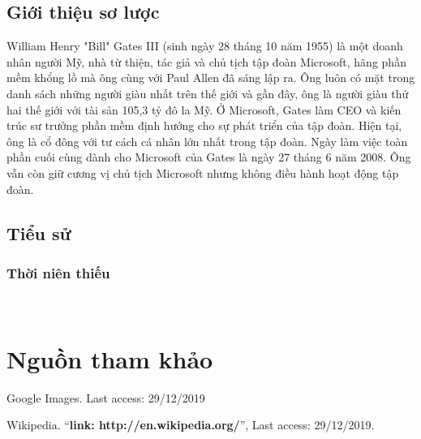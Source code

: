 \documentclass[12pt,a4paper]{article}  %
\begin{document}
 \subsection{Giới thiệu sơ lược}
 \begin{center}

 \end{center}
  William Henry "Bill" Gates III (sinh ngày 28 tháng 10 năm 1955) là một doanh nhân người Mỹ, nhà từ thiện, tác giả và chủ tịch tập đoàn Microsoft, hãng phần mềm khổng lồ mà ông cùng với Paul Allen đã sáng lập ra. Ông luôn có mặt trong danh sách những người giàu nhất trên thế giới và gần đây, ông là người giàu thứ hai thế giới với tài sản 105,3 tỷ đô la Mỹ. Ở Microsoft, Gates làm CEO và kiến trúc sư trưởng phần mềm định hướng cho sự phát triển của tập đoàn. Hiện tại, ông là cổ đông với tư cách cá nhân lớn nhất trong tập đoàn. Ngày làm việc toàn phần cuối cùng dành cho Microsoft của Gates là ngày 27 tháng 6 năm 2008. Ông vẫn còn giữ cương vị chủ tịch Microsoft nhưng không điều hành hoạt động tập đoàn.
  \subsection{Tiểu sử} %
   \subsubsection{Thời niên thiếu} %
    \begin{center}
   	\end{center}
\newpage

\
\newpage
\section{Nguồn tham khảo}
\begin{thebibliography}{80}


	 Google Images. Last access: 29/12/2019


	 Wikipedia.
	``\textbf{link: http://en.wikipedia.org/}'',
	Last access: 29/12/2019.
	
	
	
\end{thebibliography}	
\end{document}
